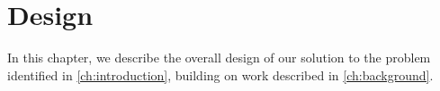 \chapter{Design}
\label{ch:design}

In this chapter, we describe the overall design of our solution to the problem identified in \ref{ch:introduction}, building on work described in \ref{ch:background}.
